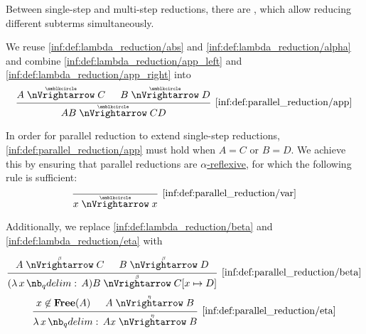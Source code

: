 \begin{definition}\label{def:parallel_reduction}
  Between single-step and multi-step reductions, there are , which allow reducing different subterms simultaneously.

  \begin{thmenum}
     We reuse \ref{inf:def:lambda_reduction/abs} and \ref{inf:def:lambda_reduction/alpha} and combine \ref{inf:def:lambda_reduction/app_left} and \ref{inf:def:lambda_reduction/app_right} into
    \begin{equation*}\taglabel[\ensuremath{ \logic{ParApp}_{\anon} }]{inf:def:parallel_reduction/app}
      \begin{prooftree}
        \hypo{ A \ppred C }
        \hypo{ B \ppred D }
        \infer2[\ref{inf:def:parallel_reduction/app}]{ AB \ppred CD }
      \end{prooftree}
    \end{equation*}

     In order for parallel reduction to extend single-step reductions, \ref{inf:def:parallel_reduction/app} must hold when \( A = C \) or \( B = D \). We achieve this by ensuring that parallel reductions are \hyperref[def:alpha_reflexive]{\( \alpha \)-reflexive}, for which the following rule is sufficient:
    \begin{equation*}\taglabel[\ensuremath{ \logic{ParVar}_{\anon} }]{inf:def:parallel_reduction/var}
      \begin{prooftree}
        \infer0[\ref{inf:def:parallel_reduction/var}]{ x \ppred x }
      \end{prooftree}
    \end{equation*}
  \end{thmenum}

   Additionally, we replace \ref{inf:def:lambda_reduction/beta} and \ref{inf:def:lambda_reduction/eta} with
  \begin{TwoColumns}
    \begin{equation*}\taglabel[\ensuremath{ \logic{ParRed}_\beta }]{inf:def:parallel_reduction/beta}
      \begin{prooftree}
        \hypo{ A \pbred C }
        \hypo{ B \pbred D }
        \infer2[\ref{inf:def:parallel_reduction/beta}]{ (\qabs x A) B \pbred C[x \mapsto D] }.
      \end{prooftree}
    \end{equation*}
  \BeginSecondColumn
    \begin{equation*}\taglabel[\ensuremath{ \logic{ParRed}_\eta }]{inf:def:parallel_reduction/eta}
      \begin{prooftree}
        \hypo{ x \not\in \op*{Free}(A) }
        \hypo{ A \pered B }
        \infer2[\ref{inf:def:parallel_reduction/eta}]{ \qabs x A x \pered B }.
      \end{prooftree}
    \end{equation*}
  \end{TwoColumns}
\end{definition}
